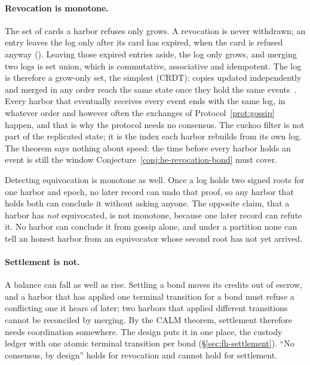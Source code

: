 \documentclass[11pt,a4paper]{article}
\theoremstyle{definition}
\theoremstyle{definition}
\theoremstyle{remark}
\begin{document}
\paragraph{Revocation is monotone.} The set of cards a harbor refuses only
grows. A revocation is never withdrawn; an entry leaves the log only after its
card has expired, when the card is refused anyway
(). Leaving those expired entries
aside, the log only grows, and merging two logs is set union, which is
commutative, associative and idempotent. The log is therefore a grow-only set,
the simplest 
(CRDT): copies updated independently and merged in any order reach the same
state once they hold the same events~. Every harbor
that eventually receives every event ends with the same log, in whatever
order and however often the exchanges of Protocol~\ref{prot:gossip} happen,
and that is why the protocol needs no consensus. The cuckoo filter is not part
of the replicated state; it is the index each harbor rebuilds from its own
log. The theorem says nothing about speed: the time before every harbor holds
an event is still the window Conjecture~\ref{conj:he-revocation-bond} must
cover.

Detecting equivocation is monotone as well. Once a log holds two signed roots
for one harbor and epoch, no later record can undo that proof, so any harbor
that holds both can conclude it without asking anyone. The opposite claim,
that a harbor has \emph{not} equivocated, is not monotone, because one later
record can refute it. No harbor can conclude it from gossip alone, and under
a partition none can tell an honest harbor from an equivocator whose second
root has not yet arrived.

\paragraph{Settlement is not.} A balance can fall as well as rise. Settling a
bond moves its credits out of escrow, and a harbor that has applied one
terminal transition for a bond must refuse a conflicting one it hears of
later; two harbors that applied different transitions cannot be reconciled by
merging. By the CALM theorem, settlement therefore needs coordination
somewhere. The design puts it in one place, the custody ledger with one atomic
terminal transition per bond (\S\ref{sec:fh-settlement}). ``No consensus, by
design'' holds for revocation and cannot hold for settlement.
\end{document}
